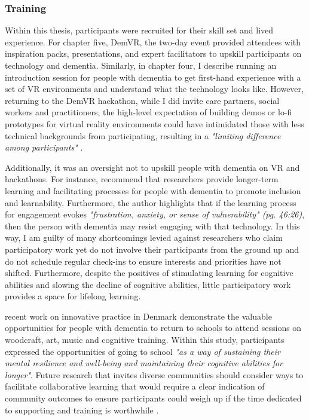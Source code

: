 \subsubsection{Training}
\label{Training}
Within this thesis, participants were recruited for their skill set and lived experience. For chapter five, DemVR, the two-day event provided attendees with inspiration packs, presentations, and expert facilitators to upskill participants on technology and dementia. Similarly, in chapter four, I describe running an introduction session for people with dementia to get first-hand experience with a set of VR environments and understand what the technology looks like. However, returning to the DemVR hackathon, while I did invite care partners, social workers and practitioners, the high-level expectation of building demos or lo-fi prototypes for virtual reality environments could have intimidated those with less technical backgrounds from participating, resulting in a \textit{"limiting difference among participants"} \citep{irani_hackathons_2015}. 

Additionally, it was an oversight not to upskill people with dementia on VR and hackathons. For instance, \cite{hwang2020exploring} recommend that researchers provide longer-term learning and facilitating processes for people with dementia to promote inclusion and learnability. Furthermore, the author highlights that if the learning process for engagement evokes \textit{"frustration, anxiety, or sense of vulnerability" (pg. 46:26)}, then the person with dementia may resist engaging with that technology. In this way, I am guilty of many shortcomings levied against researchers who claim participatory work yet do not involve their participants from the ground up and do not schedule regular check-ins to ensure interests and priorities have not shifted. Furthermore, despite the positives of stimulating learning for cognitive abilities and slowing the decline of cognitive abilities, little participatory work provides a space for lifelong learning. 

\cite{ward2020going} recent work on innovative practice in Denmark demonstrate the valuable opportunities for people with dementia to return to schools to attend sessions on woodcraft, art, music and cognitive training. Within this study, participants expressed the opportunities of going to school \textit{"as a way of sustaining their mental resilience and well-being and maintaining their cognitive abilities for longer"}. Future research that invites diverse communities should consider ways to facilitate collaborative learning that would require a clear indication of community outcomes to ensure participants could weigh up if the time dedicated to supporting and training is worthwhile \citep{hayes2020inclusive}.

